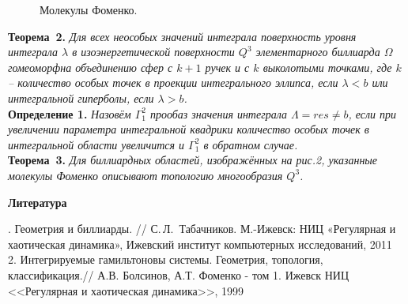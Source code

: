 \begin{figure}[h!]
	\caption{Молекулы Фоменко.}
\end{figure}

\textbf{Теорема~2.} {\it Для всех неособых значений интеграла повер\-хность уровня интеграла $\lambda$
	в изоэнергетичес\-кой поверхности $Q^3$ элементарного биллиарда $\Omega$ гомеоморфна объединению сфер с $k+1$ ручек и с $k$ выколотыми точками, где $k$ -- количество особых точек в проекции интегрального эллипса, если $\lambda<b$ или интегральной гиперболы, если $\lambda>b$.} \\
\textbf{Определение 1.} {\it
	Назовём $\Gamma^2_1$ прообаз значения интеграла $\varLambda = res \neq b$, если при увеличении параметра интегральной квадрики количество особых точек в интегральной области увеличится и $\Gamma^2_1$ в обратном случае. } \\
\textbf{Теорема~3.} {\it Для биллиардных областей, изображённых на рис.2, указанные молекулы Фоменко описывают топологию многообразия $Q^3$. }



\smallskip \centerline{\bf Литература}.  Геометрия и биллиарды. // С.\,Л.~Табачников. М.-Ижевск: НИЦ «Регулярная и хаотическая динамика», Ижевский институт компьютерных исследований,
2011 \\
2. Интегрируемые гамильтоновы системы. Геометрия, топология, классификация.// 	А.В. Болсинов, А.Т. Фоменко - том 1. Ижевск НИЦ	<<Регулярная и хаотическая динамика>>, 1999\\


